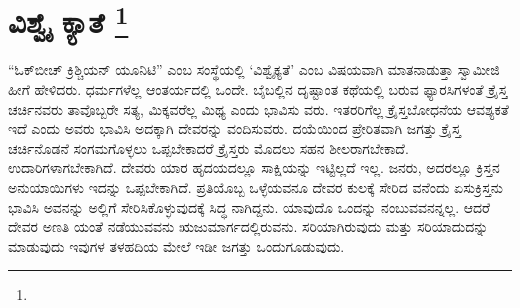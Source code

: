
\chapter[ವಿಶ್ವೈ ಕ್ಯಾತೆ ]{ವಿಶ್ವೈ ಕ್ಯಾತೆ \protect\footnote{}}

“ಓಕ್​ಬೀಚ್​ ಕ್ರಿಶ್ಚಿಯನ್​ ಯೂನಿಟಿ” ಎಂಬ ಸಂಸ್ಥೆಯಲ್ಲಿ ‘ವಿಶ್ವೈಕ್ಯತೆ’ ಎಂಬ ವಿಷಯವಾಗಿ ಮಾತನಾಡುತ್ತಾ ಸ್ವಾಮೀಜಿ ಹೀಗೆ ಹೇಳಿದರು. ಧರ್ಮಗಳೆಲ್ಲ ಆಂತರ್ಯದಲ್ಲಿ ಒಂದೇ. ಬೈಬಲ್ಲಿನ ದೃಷ್ಟಾಂತ ಕಥೆಯಲ್ಲಿ ಬರುವ ಫ್ಯಾರಸಿಗಳಂತೆ ಕ್ರೈಸ್ತ ಚರ್ಚಿನವರು ತಾವೊಬ್ಬರೇ ಸತ್ಯ, ಮಿಕ್ಕವರೆಲ್ಲ ಮಿಥ್ಯ ಎಂದು ಭಾವಿಸು ವರು. ಇತರರಿಗೆಲ್ಲ ಕ್ರೈಸ್ತಬೋಧನೆಯ ಆವಶ್ಯಕತೆ ಇದೆ ಎಂದು ಅವರು ಭಾವಿಸಿ ಅದಕ್ಕಾಗಿ ದೇವರನ್ನು ವಂದಿಸುವರು. ದಯೆಯಿಂದ ಪ್ರೇರಿತವಾಗಿ ಜಗತ್ತು ಕ್ರೈಸ್ತ ಚರ್ಚಿನೊಡನೆ ಸಂಗಮಗೊಳ್ಳಲು ಒಪ್ಪಬೇಕಾದರೆ ಕ್ರೈಸ್ತರು ಮೊದಲು ಸಹನ ಶೀಲರಾಗಬೇಕಾದೆ. ಉದಾರಿಗಳಾಗಬೇಕಾಗಿದೆ. ದೇವರು ಯಾರ ಹೃದಯದಲ್ಲೂ ಸಾಕ್ಷಿಯನ್ನು ಇಟ್ಟಿಲ್ಲದೆ ಇಲ್ಲ. ಜನರು, ಅದರಲ್ಲೂ ಕ್ರಿಸ್ತನ ಅನುಯಾಯಿಗಳು ಇದನ್ನು ಒಪ್ಪಬೇಕಾಗಿದೆ. ಪ್ರತಿಯೊಬ್ಬ ಒಳ್ಳೆಯವನೂ ದೇವರ ಕುಲಕ್ಕೆ ಸೇರಿದ ವನೆಂದು ಏಸುಕ್ರಿಸ್ತನು ಭಾವಿಸಿ ಅವನನ್ನು ಅಲ್ಲಿಗೆ ಸೇರಿಸಿಕೊಳ್ಳುವುದಕ್ಕೆ ಸಿದ್ಧ ನಾಗಿದ್ದನು. ಯಾವುದೊ ಒಂದನ್ನು ನಂಬುವವನನ್ನಲ್ಲ. ಆದರೆ ದೇವರ ಅಣತಿ ಯಂತೆ ನಡೆಯುವವನು ಋಜುಮಾರ್ಗದಲ್ಲಿರುವನು. ಸರಿಯಾಗಿರುವುದು ಮತ್ತು ಸರಿಯಾದುದನ್ನು ಮಾಡುವುದು ಇವುಗಳ ತಳಹದಿಯ ಮೇಲೆ ಇಡೀ ಜಗತ್ತು ಒಂದುಗೂಡುವುದು.


